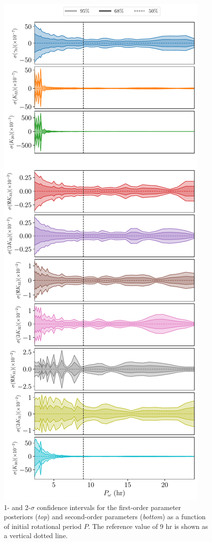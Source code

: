 \documentclass[fleqn,usenatbib]{mnras}
\begin{document}
\begin{figure}
  \centering
  \includegraphics[height=0.89\textheight]{figs/scan-period.pdf}
  \caption{1- and 2-$\sigma$ confidence intervals for the first-order parameter posteriors (\textit{top}) and second-order parameters (\textit{bottom}) as a function of initial rotational period $P$. The reference value of 9 hr is shown as a vertical dotted line.}
  \label{fig:scan-period}
\end{figure}
\end{document}
